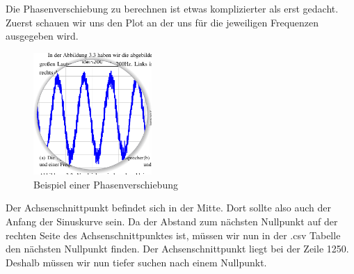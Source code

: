 \documentclass[12pt, oneside, a4paper, \docLanguage]{report}
\begin{document}
\newpage

Die Phasenverschiebung zu berechnen ist etwas komplizierter als erst gedacht.
Zuerst schauen wir uns den Plot an der uns für die jeweiligen Frequenzen ausgegeben wird.


\begin{figure}[H]
	\centering\small
	\includegraphics[width=0.4\textwidth]{media/phase.png}
	\caption{Beispiel einer Phasenverschiebung}
	\label{img:Beispiel einer Phasenverschiebung}
\end{figure}

Der Achsenschnittpunkt befindet sich in der Mitte. Dort sollte also auch der Anfang der Sinuskurve sein. Da der Abstand zum nächsten Nullpunkt auf der rechten Seite des Achsenschnittpunktes ist, müssen wir nun in der .csv Tabelle den nächsten Nullpunkt finden.
Der Achsenschnittpunkt liegt bei der Zeile 1250. Deshalb müssen wir nun tiefer suchen nach einem Nullpunkt.
\end{document}
